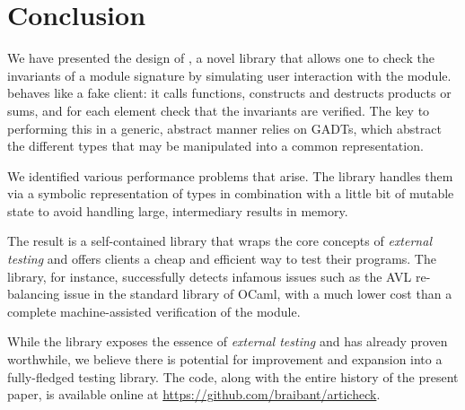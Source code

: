 \section*{Conclusion}

We have presented the design of \arti, a novel library that allows one to check
the invariants of a module signature by simulating user interaction with the
module. \arti behaves like a fake client: it calls functions, constructs and
destructs products or sums, and for each element check that the invariants are
verified. The key to performing this in a generic, abstract manner relies on
GADTs, which abstract the different types that may be manipulated into a common
representation.

We identified various performance problems that arise. The library handles them
via a symbolic representation of types in combination with a little bit of
mutable state to avoid handling large, intermediary results in memory.

The result is a self-contained library that wraps the core concepts of
\emph{external testing} and offers clients a cheap and efficient way to test
their programs. The library, for instance, successfully detects infamous issues
such as the AVL re-balancing issue in the standard library of OCaml, with a much
lower cost than a complete machine-assisted verification of the module.

While the library exposes the essence of \emph{external testing} and has already
proven worthwhile, we believe there is potential for improvement and expansion
into a fully-fledged testing library. The code, along with the entire history of
the present paper, is available online at
\url{https://github.com/braibant/articheck}.
